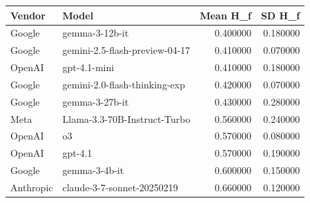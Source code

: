 \begin{tabular}{llrr}
\toprule
Vendor & Model & Mean H_f & SD H_f \\
\midrule
Google & gemma-3-12b-it & 0.400000 & 0.180000 \\
Google & gemini-2.5-flash-preview-04-17 & 0.410000 & 0.070000 \\
OpenAI & gpt-4.1-mini & 0.410000 & 0.180000 \\
Google & gemini-2.0-flash-thinking-exp & 0.420000 & 0.070000 \\
Google & gemma-3-27b-it & 0.430000 & 0.280000 \\
Meta & Llama-3.3-70B-Instruct-Turbo & 0.560000 & 0.240000 \\
OpenAI & o3 & 0.570000 & 0.080000 \\
OpenAI & gpt-4.1 & 0.570000 & 0.190000 \\
Google & gemma-3-4b-it & 0.600000 & 0.150000 \\
Anthropic & claude-3-7-sonnet-20250219 & 0.660000 & 0.120000 \\
\bottomrule
\end{tabular}
